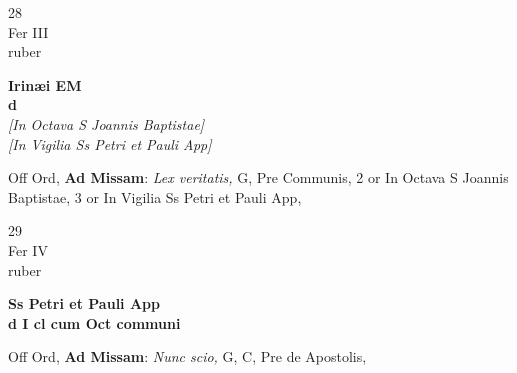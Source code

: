 \documentclass[10pt, openany]{book}
\begin{document}
        \begin{center}
            \begin{minipage}{3.5in}
                \vspace{2em}
                \begin{minipage}{0.5in}
                    {\Huge 28} \\
                    {\normalsize Fer III} \\
                    {\normalsize ruber}
                \end{minipage}
                \begin{minipage}{3.0in}
                    \textbf{ \large Irinæi EM \\
                    \textnormal{\normalsize d}} \\ \textit{[In Octava S Joannis Baptistae]} \\ \textit{[In Vigilia Ss Petri et Pauli App]} \\ 
                \end{minipage}
                \begin{justify}Off Ord, \textbf{Ad Missam}: \textit{Lex veritatis,} G, Pre Communis, 2 or In Octava S Joannis Baptistae, 3 or In Vigilia Ss Petri et Pauli App,  
                \end{justify}
            \end{minipage}
        \end{center}
    
        \begin{center}
            \begin{minipage}{3.5in}
                \vspace{2em}
                \begin{minipage}{0.5in}
                    {\Huge 29} \\
                    {\normalsize Fer IV} \\
                    {\normalsize ruber}
                \end{minipage}
                \begin{minipage}{3.0in}
                    \textbf{ \large Ss Petri et Pauli App \\
                    \textnormal{\normalsize d I cl cum Oct communi}} \\ 
                \end{minipage}
                \begin{justify}Off Ord, \textbf{Ad Missam}: \textit{Nunc scio,} G, C, Pre de Apostolis,  
                \end{justify}
            \end{minipage}
        \end{center}
    
\end{document}
